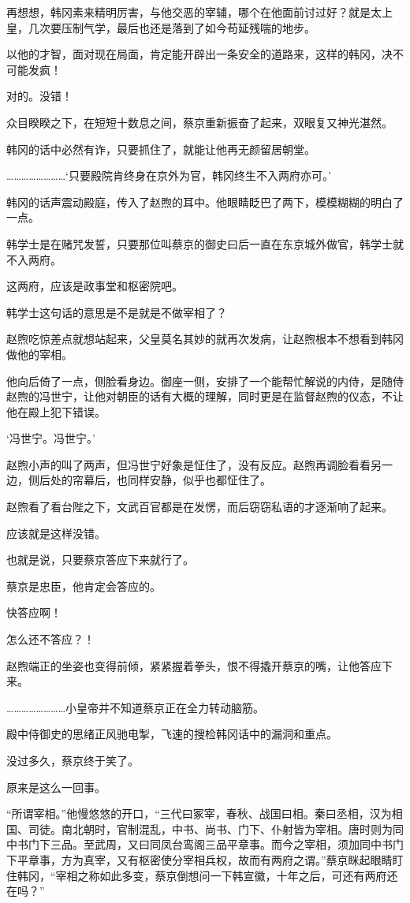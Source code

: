 再想想，韩冈素来精明厉害，与他交恶的宰辅，哪个在他面前讨过好？就是太上皇，几次要压制气学，最后也还是落到了如今苟延残喘的地步。

以他的才智，面对现在局面，肯定能开辟出一条安全的道路来，这样的韩冈，决不可能发疯！

对的。没错！

众目睽睽之下，在短短十数息之间，蔡京重新振奋了起来，双眼复又神光湛然。

韩冈的话中必然有诈，只要抓住了，就能让他再无颜留居朝堂。

……………………‘只要殿院肯终身在京外为官，韩冈终生不入两府亦可。’

韩冈的话声震动殿庭，传入了赵煦的耳中。他眼睛眨巴了两下，模模糊糊的明白了一点。

韩学士是在赌咒发誓，只要那位叫蔡京的御史曰后一直在东京城外做官，韩学士就不入两府。

这两府，应该是政事堂和枢密院吧。

韩学士这句话的意思是不是就是不做宰相了？

赵煦吃惊差点就想站起来，父皇莫名其妙的就再次发病，让赵煦根本不想看到韩冈做他的宰相。

他向后倚了一点，侧脸看身边。御座一侧，安排了一个能帮忙解说的内侍，是随侍赵煦的冯世宁，让他对朝臣的话有大概的理解，同时更是在监督赵煦的仪态，不让他在殿上犯下错误。

‘冯世宁。冯世宁。’

赵煦小声的叫了两声，但冯世宁好象是怔住了，没有反应。赵煦再调脸看看另一边，侧后处的帘幕后，也同样安静，似乎也都怔住了。

赵煦看了看台陛之下，文武百官都是在发愣，而后窃窃私语的才逐渐响了起来。

应该就是这样没错。

也就是说，只要蔡京答应下来就行了。

蔡京是忠臣，他肯定会答应的。

快答应啊！

怎么还不答应？！

赵煦端正的坐姿也变得前倾，紧紧握着拳头，恨不得撬开蔡京的嘴，让他答应下来。

……………………小皇帝并不知道蔡京正在全力转动脑筋。

殿中侍御史的思绪正风驰电掣，飞速的搜检韩冈话中的漏洞和重点。

没过多久，蔡京终于笑了。

原来是这么一回事。

“所谓宰相。”他慢悠悠的开口，“三代曰冢宰，春秋、战国曰相。秦曰丞相，汉为相国、司徒。南北朝时，官制混乱，中书、尚书、门下、仆射皆为宰相。唐时则为同中书门下三品。至武周，又曰同凤台鸾阁三品平章事。而今之宰相，须加同中书门下平章事，方为真宰，又有枢密使分宰相兵权，故而有两府之谓。”蔡京眯起眼睛盯住韩冈，“宰相之称如此多变，蔡京倒想问一下韩宣徽，十年之后，可还有两府还在吗？”

